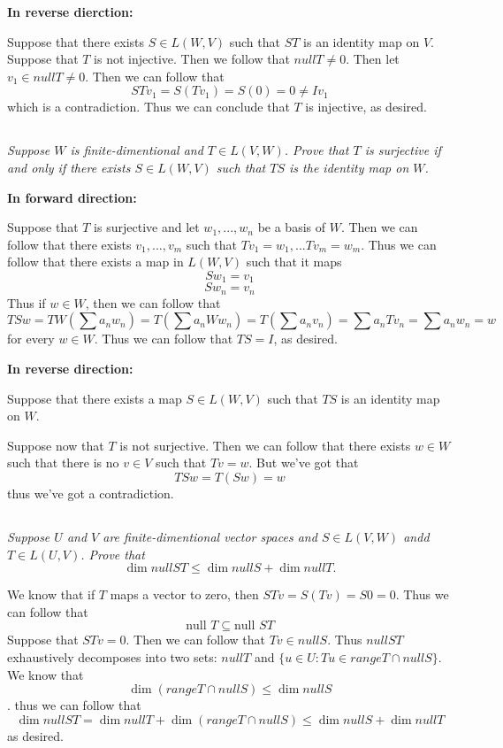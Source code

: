 \documentclass[11pt,oneside,titlepage]{book}
\begin{document}
\textbf{In reverse dierction: }

Suppose that there exists $S \in L(W, V)$ such that $ST$ is an identity map on $V$. Suppose that
$T$ is not injective.  Then we follow that $null T \neq 0$.
Then let $v_1 \in null T \neq 0$. Then we can follow that
$$ST v_1 = S(T v_1) = S(0) = 0 \neq Iv_1$$
which is a contradiction. Thus we can conclude that $T$ is injective, as desired.

\subsection{}

\textit{Suppose $W$ is finite-dimentional and $T \in L(V, W)$. Prove that $T$ is surjective
  if and only if there exists $S \in L(W, V)$ such that $TS$ is the identity map on $W$.}

\textbf{In forward direction:}

Suppose that $T$ is surjective and let $w_1, ..., w_n$ be a basis of $W$. Then we can follow
that there exists $v_1, ..., v_m$ such that $T v_1 = w_1, ... T v_m = w_m$.
Thus we can follow that there exists a map in $L(W, V)$ such
that it maps
$$S w_1 = v_1$$
$$S w_n = v_n$$
Thus if $w \in W$, then we can follow that
$$TS w = TW(\sum a_n w_n) = T(\sum a_n W  w_n) =  T(\sum a_n v_n) =  \sum a_n T v_n =
\sum a_n w_n = w$$
for every $w \in W$. Thus we can follow that $TS = I$, as desired.

\textbf{In reverse direction:}

Suppose that there exists a map $S \in L(W, V)$ such that $TS$ is an identity map on $W$. 

Suppose now that $T$ is not surjective. Then we can follow that there exists $w \in W$ such that
there is no $v \in V$ such that $Tv = w$. But we've got that
$$TS w = T(Sw) = w$$
thus we've got a contradiction.

\subsection{}

\textit{Suppose $U$ and $V$ are finite-dimentional vector spaces and $S \in L(V, W)$ andd
  $T \in L(U, V)$. Prove that }
$$\dim null ST \leq \dim null S + \dim null T.$$

We know that if $T$ maps a vector to zero, then $STv = S(Tv) = S0 = 0$. Thus we can follow that
$$\text{null } T \subseteq \text{null } ST$$
Suppose that $STv = 0$. Then we can follow that $Tv \in null S$. Thus $ null ST $ exhaustively
decomposes into two sets: $null T$ and $\{u \in U : Tu \in range T \cap null S\}$. We know that
$$\dim (range T \cap null S) \leq \dim null S$$.
thus we can follow that
$$\dim null ST = \dim null T + \dim (range T \cap null S) \leq   \dim null S + \dim null T$$
as desired.
\end{document}
